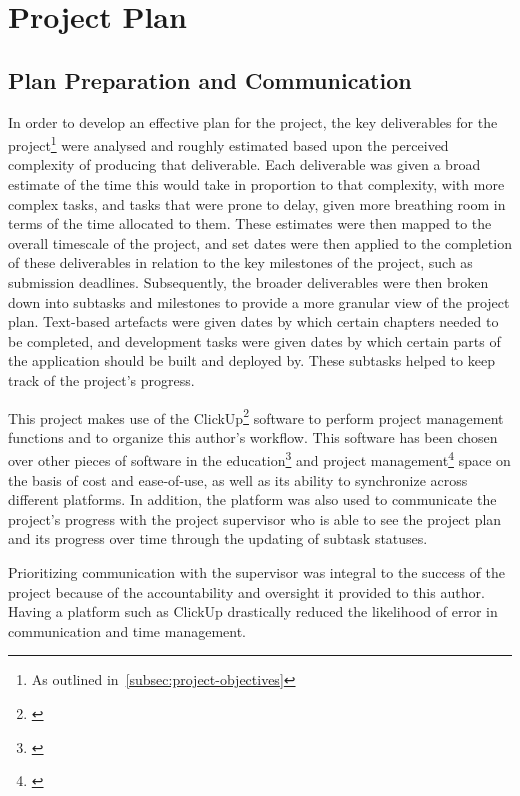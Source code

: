 
\thispagestyle{plain}
\newpage
\section{Project Plan}\label{sec:project-plan}

\normalsize

\subsection{Plan Preparation and Communication}\label{subsec:plan-preparation-and-communication}

In order to develop an effective plan for the project, the key deliverables for the project\footnote{As outlined in~\ref{subsec:project-objectives}} were analysed and roughly estimated based upon the perceived complexity of producing that deliverable.
Each deliverable was given a broad estimate of the time this would take in proportion to that complexity, with more complex tasks, and tasks that were prone to delay, given more breathing room in terms of the time allocated to them.
These estimates were then mapped to the overall timescale of the project, and set dates were then applied to the completion of these deliverables in relation to the key milestones of the project, such as submission deadlines.
Subsequently, the broader deliverables were then broken down into subtasks and milestones to provide a more granular view of the project plan.
Text-based artefacts were given dates by which certain chapters needed to be completed, and development tasks were given dates by which certain parts of the application should be built and deployed by.
These subtasks helped to keep track of the project's progress.

This project makes use of the ClickUp\footnote{\citep{clickup}} software to perform project management functions and to organize this author’s workflow.
This software has been chosen over other pieces of software in the education\footnote{\citep{education_software}} and project management\footnote{\citep{pm_software}} space on the basis of cost and ease-of-use, as well as its ability to synchronize across different platforms.
In addition, the platform was also used to communicate the project's progress with the project supervisor who is able to see the project plan and its progress over time through the updating of subtask statuses.

Prioritizing communication with the supervisor was integral to the success of the project because of the accountability and oversight it provided to this author.
Having a platform such as ClickUp drastically reduced the likelihood of error in communication and time management.


